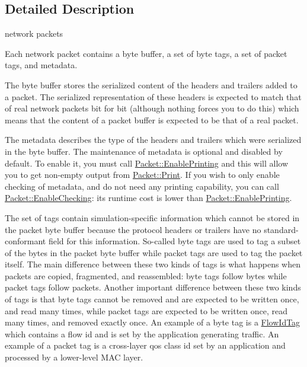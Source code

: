 \subsection{Detailed Description}
network packets 

Each network packet contains a byte buffer, a set of byte tags, a set of packet tags, and metadata.


\begin{DoxyItemize}
\item The byte buffer stores the serialized content of the headers and trailers added to a packet. The serialized representation of these headers is expected to match that of real network packets bit for bit (although nothing forces you to do this) which means that the content of a packet buffer is expected to be that of a real packet.
\item The metadata describes the type of the headers and trailers which were serialized in the byte buffer. The maintenance of metadata is optional and disabled by default. To enable it, you must call \hyperlink{classns3_1_1Packet_ae17c0cd8e63e83df3c9273801e3d5d7f}{Packet\+::\+Enable\+Printing} and this will allow you to get non-\/empty output from \hyperlink{classns3_1_1Packet_aa34058a5cdbf94673531f8c4001ab227}{Packet\+::\+Print}. If you wish to only enable checking of metadata, and do not need any printing capability, you can call \hyperlink{classns3_1_1Packet_abf6564e3496f2b8852774c98bd839b85}{Packet\+::\+Enable\+Checking}\+: its runtime cost is lower than \hyperlink{classns3_1_1Packet_ae17c0cd8e63e83df3c9273801e3d5d7f}{Packet\+::\+Enable\+Printing}.
\item The set of tags contain simulation-\/specific information which cannot be stored in the packet byte buffer because the protocol headers or trailers have no standard-\/conformant field for this information. So-\/called \textquotesingle{}byte\textquotesingle{} tags are used to tag a subset of the bytes in the packet byte buffer while \textquotesingle{}packet\textquotesingle{} tags are used to tag the packet itself. The main difference between these two kinds of tags is what happens when packets are copied, fragmented, and reassembled\+: \textquotesingle{}byte\textquotesingle{} tags follow bytes while \textquotesingle{}packet\textquotesingle{} tags follow packets. Another important difference between these two kinds of tags is that byte tags cannot be removed and are expected to be written once, and read many times, while packet tags are expected to be written once, read many times, and removed exactly once. An example of a \textquotesingle{}byte\textquotesingle{} tag is a \hyperlink{classns3_1_1FlowIdTag}{Flow\+Id\+Tag} which contains a flow id and is set by the application generating traffic. An example of a \textquotesingle{}packet\textquotesingle{} tag is a cross-\/layer qos class id set by an application and processed by a lower-\/level M\+AC layer.
\end{DoxyItemize}

